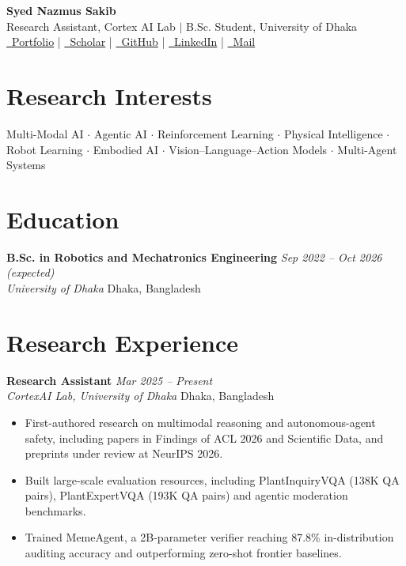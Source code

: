 \documentclass[a4paper,10pt]{article}
\newcommand{\entry}[4]{%
    \noindent\textbf{#1} \hfill \textit{#2} \\
    \textit{\color{descgray}#3} \hfill {\color{descgray}#4}%
}
\begin{document}
\begin{center}
    {\Huge\bfseries Syed Nazmus Sakib} \\[4pt]
    {\color{descgray}\normalsize Research Assistant, Cortex AI Lab $\mid$ B.Sc. Student, University of Dhaka} \\[7pt]
    {\small
    \href{https://syed-nazmus-sakib.github.io/}{\faGlobe~Portfolio} \enspace\textcolor{rulegray}{|}\enspace
    \href{https://scholar.google.com/citations?user=4j76UvsAAAAJ\&hl=en}{\faGraduationCap~Scholar} \enspace\textcolor{rulegray}{|}\enspace
    \href{https://github.com/syed-nazmus-sakib}{\faGithub~GitHub} \enspace\textcolor{rulegray}{|}\enspace
    \href{https://www.linkedin.com/in/nazmus-sakib-syed}{\faLinkedin~LinkedIn} \enspace\textcolor{rulegray}{|}\enspace
    \href{mailto:syednazmus-2021211399@rme.du.ac.bd}{\faEnvelope~Mail}
    }
\end{center}
\vspace{-3pt}

\section*{Research Interests}
Multi-Modal AI $\cdot$ Agentic AI $\cdot$ Reinforcement Learning $\cdot$ Physical Intelligence $\cdot$ Robot Learning $\cdot$ Embodied AI $\cdot$ Vision--Language--Action Models $\cdot$ Multi-Agent Systems

\section*{Education}
\entry{B.Sc. in Robotics and Mechatronics Engineering}{Sep 2022 -- Oct 2026 (expected)}{University of Dhaka}{Dhaka, Bangladesh}

\section*{Research Experience}

\entry{Research Assistant}{Mar 2025 -- Present}{CortexAI Lab, University of Dhaka}{Dhaka, Bangladesh}
\begin{itemize}
    \item First-authored research on multimodal reasoning and autonomous-agent safety, including papers in Findings of ACL 2026 and Scientific Data, and preprints under review at NeurIPS 2026.
    \item Built large-scale evaluation resources, including PlantInquiryVQA (138K QA pairs), PlantExpertVQA (193K QA pairs) and agentic moderation benchmarks.
    \item Trained MemeAgent, a 2B-parameter verifier reaching 87.8\% in-distribution auditing accuracy and outperforming zero-shot frontier baselines.
\end{itemize}
\vspace{3pt}
\end{document}
